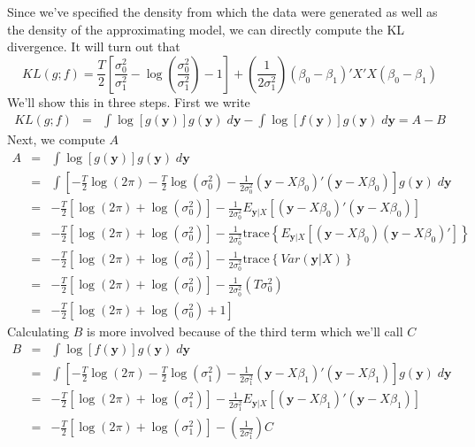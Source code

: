 \documentclass[12pt]{article}
\theoremstyle{definition}
\begin{document}
Since we've specified the density from which the data were generated as well as the density of the approximating model, we can directly compute the KL divergence. It will turn out that
	$$KL(g;f) =  \frac{T}{2}\left[\frac{\sigma_0^2}{\sigma_1^2} - \log\left(\frac{\sigma_0^2}{\sigma_1^2}\right) - 1 \right] + \left(\frac{1}{2 \sigma_1^2}\right)\left(\beta_0 - \beta_1\right)'X'X\left(\beta_0 - \beta_1\right)$$
We'll show this in three steps. First we write
\begin{eqnarray*}
	KL(g;f)&=& \int \log[g(\mathbf{y})] g(\mathbf{y}) \; d \mathbf{y} - \int \log[f(\mathbf{y})]g(\mathbf{y}) \; d \mathbf{y} =  A - B 
\end{eqnarray*}
Next, we compute $A$ 
\begin{eqnarray*}
	A &=&\int \log[g(\mathbf{y})] g(\mathbf{y}) \; d \mathbf{y} \\
	&=& \int \left[-\frac{T}{2}\log(2\pi) -\frac{T}{2} \log(\sigma^2_0) - \frac{1}{2\sigma_0^2}\left(\textbf{y} - X\beta_0\right)'\left(\textbf{y} -X\beta_0\right) \right] g(\mathbf{y})\; d\mathbf{y}\\
	&=& -\frac{T}{2}\left[ \log(2\pi) + \log(\sigma^2_0)\right] -  \frac{1}{2\sigma_0^2} E_{\mathbf{y}|X}\left[\left(\textbf{y} - X\beta_0\right)'\left(\textbf{y} -X\beta_0\right)\right]\\
	&=& -\frac{T}{2}\left[ \log(2\pi) + \log(\sigma^2_0)\right] -  \frac{1}{2\sigma_0^2}\mbox{trace}\left\{ E_{\mathbf{y}|X}\left[\left(\textbf{y} - X\beta_0\right)\left(\textbf{y} -X\beta_0\right)'\right]\right\}\\
	&=& -\frac{T}{2}\left[ \log(2\pi) + \log(\sigma^2_0)\right] -  \frac{1}{2\sigma_0^2}\mbox{trace}\left\{ Var(\mathbf{y}|X)\right\}\\
	&=& -\frac{T}{2}\left[ \log(2\pi) + \log(\sigma^2_0)\right] -  \frac{1}{2\sigma_0^2}\left(T \sigma_0^2\right)\\
	&=& -\frac{T}{2}\left[ \log(2\pi) + \log(\sigma^2_0) +  1 \right]
\end{eqnarray*}
Calculating $B$ is more involved because of the third term which we'll call $C$
\begin{eqnarray*}
	B &=& \int \log[f(\mathbf{y})] g(\mathbf{y}) \; d \mathbf{y}\\
	&=& \int \left[ -\frac{T}{2}\log(2\pi) -\frac{T}{2} \log(\sigma^2_1) - \frac{1}{2\sigma_1^2}\left(\textbf{y} - X\beta_1\right)'\left(\textbf{y} -X\beta_1\right) \right] g(\mathbf{y})\;  d \mathbf{y}\\
		&=& -\frac{T}{2}\left[\log(2\pi) + \log(\sigma^2_1) \right]- \frac{1}{2\sigma_1^2}E_{\mathbf{y}|X}\left[\left(\textbf{y} - X\beta_1\right)'\left(\textbf{y} -X\beta_1\right)\right]\\
		&=&  -\frac{T}{2}\left[\log(2\pi) + \log(\sigma^2_1) \right] - \left(\frac{1}{2\sigma_1^2}\right)C
\end{eqnarray*}
\end{document}
